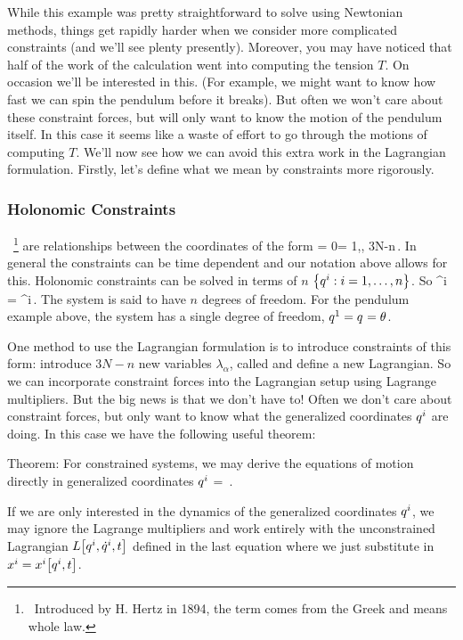 While this example was pretty straightforward to solve using Newtonian methods, things get rapidly harder when we consider more complicated constraints (and we'll see plenty presently). Moreover, you may have noticed that half of the work of the calculation went into computing the tension $T$. On occasion we'll be interested in this. (For example, we might want to know how fast we can spin the pendulum before it breaks). But often we won't care about these constraint forces, but will only want to know the motion of the pendulum itself. In this case it seems like a waste of effort to go through the motions of computing $T$. We'll now see how we can avoid this extra work in the Lagrangian formulation. Firstly, let's define what we mean by constraints more rigorously.

\subsubsection{Holonomic Constraints} ~\footnote{~Introduced by H. Hertz in 1894, the term  comes from the Greek and means whole law.} are relationships between the coordinates of the form
\beq
\gfor\alpha{} = 0\qquad\alpha = 1,\dotsc, 3N-n\,.
\eeq
In general the constraints can be time dependent and our notation above allows for this. Holonomic constraints can be solved in terms of $n$  $\left\lbrace{{{q}^{i}}:{i = 1,\dotsc,n}}\right\rbrace$. So 
\beq
\pvec^i = \pvec^i\,.
\eeq
The system is said to have $n$ degrees of freedom. For the pendulum example above, the system has a single degree of freedom, ${q}^{1} = {q}^{} = \theta$. 

One method to use the Lagrangian formulation is to introduce constraints of this form: introduce $3N-n$ new variables $\lambda_\alpha$, called  and define a new Lagrangian. So we can incorporate constraint forces into the Lagrangian setup using Lagrange multipliers. But the big news is that we don't have to! Often we don't care about constraint forces, but only want to know what the generalized coordinates ${q}^{i}$ are doing. In this case we have the following useful theorem:

Theorem: For constrained systems, we may derive the equations of motion directly in generalized coordinates ${q}^{i}$
\beq
\lag{} = \lag{} \,.
\eeq

If we are only interested in the dynamics of the generalized coordinates ${q}^{i}$, we may ignore the Lagrange multipliers and work entirely with the unconstrained Lagrangian $L\!\left[{{q}^{i}, {\dot{q}}^{i}, t}\right]$ defined in the last equation where we just substitute in $x^i = x^i\!\left[{{q}^{i},t}\right]$.

